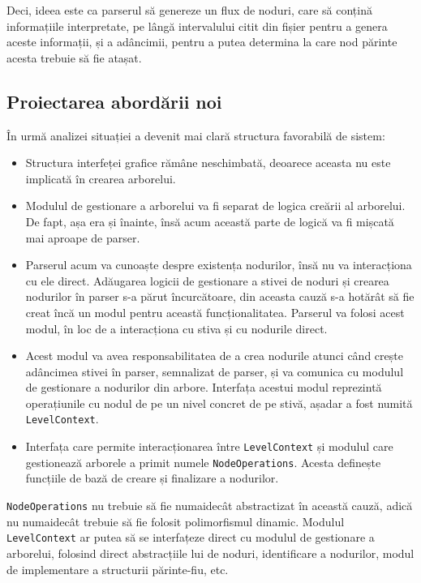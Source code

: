 \documentclass[a4paper,12pt]{report}
\begin{document}
Deci, ideea este ca parserul să genereze un flux de noduri,
care să conțină informațiile interpretate,
pe lângă intervalului citit din fișier pentru a genera aceste informații,
și a adâncimii, pentru a putea determina la care nod părinte acesta trebuie să fie atașat.

\subsection{Proiectarea abordării noi}

În urmă analizei situației a devenit mai clară structura favorabilă de sistem:
\begin{itemize}
    \item 
        Structura interfeței grafice rămâne neschimbată, 
        deoarece aceasta nu este implicată în crearea arborelui.

    \item
        Modulul de gestionare a arborelui va fi separat de logica creării al arborelui.
        De fapt, așa era și înainte, însă acum această parte de logică va fi mișcată mai aproape de parser.
        
    \item
        Parserul acum va cunoaște despre existența nodurilor, însă nu va interacționa cu ele direct.
        Adăugarea logicii de gestionare a stivei de noduri și crearea nodurilor în parser s-a părut încurcătoare,
        din aceasta cauză s-a hotărât să fie creat încă un modul pentru această funcționalitatea.
        Parserul va folosi acest modul, în loc de a interacționa cu stiva și cu nodurile direct.

    \item
        Acest modul va avea responsabilitatea de a crea nodurile atunci când crește adâncimea stivei în parser,
        semnalizat de parser, și va comunica cu modulul de gestionare a nodurilor din arbore.
        Interfața acestui modul reprezintă operațiunile cu nodul de pe un nivel concret de pe stivă, 
        așadar a fost numită \texttt{LevelContext}.

    \item
        Interfața care permite interacționarea între \texttt{LevelContext}
        și modulul care gestionează arborele a primit numele \texttt{NodeOperations}.
        Acesta definește funcțiile de bază de creare și finalizare a nodurilor.
\end{itemize}

\texttt{NodeOperations} nu trebuie să fie numaidecât abstractizat în această cauză,
adică nu numaidecât trebuie să fie folosit polimorfismul dinamic.
Modulul \texttt{LevelContext} ar putea să se interfațeze direct cu modulul de gestionare a arborelui,
folosind direct abstracțiile lui de noduri, identificare a nodurilor,
modul de implementare a structurii părinte-fiu, etc.
\end{document}
